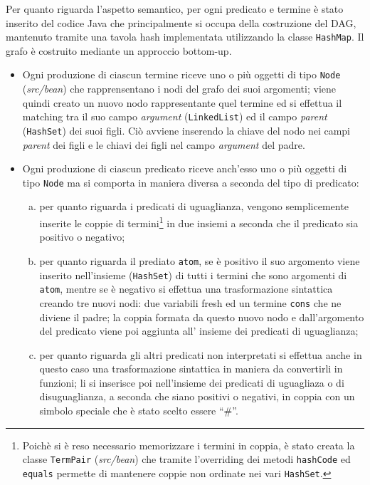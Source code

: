 \documentclass[a4paper,11pt]{article}
\begin{document}
\par
Per quanto riguarda l'aspetto semantico, per ogni predicato e 
termine è stato inserito del codice Java che principalmente si occupa 
della costruzione del DAG, mantenuto tramite una tavola hash 
implementata utilizzando la classe \texttt{HashMap}. Il grafo è 
costruito mediante un approccio bottom-up.
\begin{itemize}
\item Ogni produzione di ciascun termine riceve uno o più oggetti di tipo 
\texttt{Node} (\emph{src/bean}) che rapprensentano i nodi del grafo dei 
suoi argomenti; viene quindi creato un nuovo nodo rappresentante quel termine 
ed si effettua il matching tra il suo campo \emph{argument} 
(\texttt{LinkedList}) ed il campo \emph{parent} (\texttt{HashSet}) 
dei suoi figli. Ciò avviene inserendo la chiave del nodo nei campi 
\emph{parent} dei figli e le chiavi dei figli nel campo \emph{argument} 
del padre.
\item Ogni produzione di ciascun predicato riceve anch'esso uno o più 
oggetti di tipo \texttt{Node} ma si comporta in maniera diversa a seconda del 
tipo di predicato:
\begin{enumerate}[a)]
\item per quanto riguarda i predicati di uguaglianza, vengono 
semplicemente inserite le coppie di termini\footnote{Poichè si è reso 
necessario memorizzare i termini in coppia, è stato creata la classe 
\texttt{TermPair} (\emph{src/bean}) che tramite l'overriding dei 
metodi \texttt{hashCode} ed \texttt{equals} permette di mantenere coppie 
non ordinate nei vari \texttt{HashSet}.} in due insiemi a seconda che 
il predicato sia positivo o negativo;
\item per quanto riguarda il prediato \texttt{atom}, se è positivo 
il suo argomento viene inserito nell'insieme (\texttt{HashSet}) di tutti 
i termini che sono argomenti di \texttt{atom}, mentre se è negativo si effettua una 
trasformazione sintattica creando tre nuovi nodi: due variabili fresh 
ed un termine \texttt{cons} che ne diviene il padre; la coppia formata da 
questo nuovo nodo e dall'argomento del predicato viene poi aggiunta all'
insieme dei predicati di uguaglianza;
\item per quanto riguarda gli altri predicati non interpretati si 
effettua anche in questo caso una trasformazione sintattica in maniera 
da convertirli in funzioni; li si inserisce poi nell'insieme dei 
predicati di uguagliaza o di disuguaglianza, a seconda che siano 
positivi o negativi, in coppia con un simbolo speciale che è stato 
scelto essere “\#”.
\end{enumerate}
\end{itemize}
\end{document}

